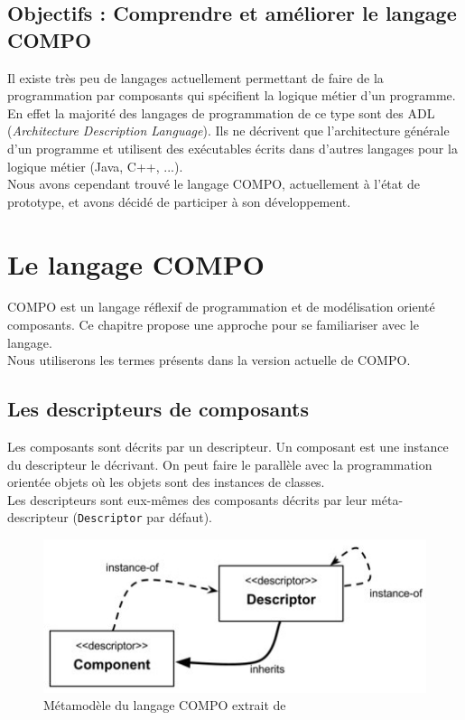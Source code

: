 \documentclass[11pt,a4paper,openany,oneside]{book}
\begin{document}
\section{Objectifs : Comprendre et améliorer le langage COMPO}

Il existe très peu de langages actuellement permettant de faire de la programmation par composants qui spécifient la logique métier d'un programme. En effet la majorité des langages de programmation de ce type sont des ADL (\textit{Architecture Description Language}). Ils ne décrivent que l'architecture générale d'un programme et utilisent des exécutables écrits dans d'autres langages pour la logique métier (Java, C++, ...).\\ 
Nous avons cependant trouvé le langage COMPO, actuellement à l'état de prototype, et avons décidé de participer à son développement.

\chapter{Le langage COMPO}

COMPO est un langage réflexif de programmation et de modélisation orienté composants. Ce chapitre propose une approche pour se familiariser avec le langage.\\
Nous utiliserons les termes présents dans la version actuelle de COMPO.

\section{Les descripteurs de composants}

Les composants sont décrits par un descripteur. Un composant est une instance du descripteur le décrivant. On peut faire le parallèle avec la programmation orientée objets où les objets sont des instances de classes.\\
Les descripteurs sont eux-mêmes des composants décrits par leur méta-descripteur (\texttt{Descriptor} par défaut).

\begin{figure}[H]
	\centering
	\includegraphics[keepaspectratio = true]{metamodel}
	\caption{Métamodèle du langage COMPO extrait de \citep{these}}
	\label{MetaModel}
\end{figure}
\end{document}
